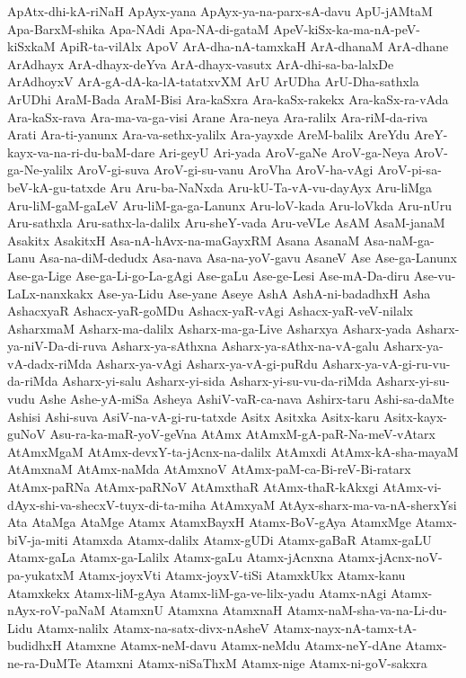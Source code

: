 {ApAtx-dhi-kA-riNaH
ApAyx-yana
ApAyx-ya-na-parx-sA-davu
ApU-jAMtaM
Apa-BarxM-shika
Apa-NAdi
Apa-NA-di-gataM
ApeV-kiSx-ka-ma-nA-peV-kiSxkaM
ApiR-ta-vilAlx
ApoV
ArA-dha-nA-tamxkaH
ArA-dhanaM
ArA-dhane
ArAdhayx
ArA-dhayx-deYva
ArA-dhayx-vasutx
ArA-dhi-sa-ba-lalxDe
ArAdhoyxV
ArA-gA-dA-ka-lA-tatatxvXM
ArU
ArUDha
ArU-Dha-sathxla
ArUDhi
AraM-Bada
AraM-Bisi
Ara-kaSxra
Ara-kaSx-rakekx
Ara-kaSx-ra-vAda
Ara-kaSx-rava
Ara-ma-va-ga-visi
Arane
Ara-neya
Ara-ralilx
Ara-riM-da-riva
Arati
Ara-ti-yanunx
Ara-va-sethx-yalilx
Ara-yayxde
AreM-balilx
AreYdu
AreY-kayx-va-na-ri-du-baM-dare
Ari-geyU
Ari-yada
AroV-gaNe
AroV-ga-Neya
AroV-ga-Ne-yalilx
AroV-gi-suva
AroV-gi-su-vanu
AroVha
AroV-ha-vAgi
AroV-pi-sa-beV-kA-gu-tatxde
Aru
Aru-ba-NaNxda
Aru-kU-Ta-vA-vu-dayAyx
Aru-liMga
Aru-liM-gaM-gaLeV
Aru-liM-ga-ga-Lanunx
Aru-loV-kada
Aru-loVkda
Aru-nUru
Aru-sathxla
Aru-sathx-la-dalilx
Aru-sheY-vada
Aru-veVLe
AsAM
AsaM-janaM
Asakitx
AsakitxH
Asa-nA-hAvx-na-maGayxRM
Asana
AsanaM
Asa-naM-ga-Lanu
Asa-na-diM-dedudx
Asa-nava
Asa-na-yoV-gavu
AsaneV
Ase
Ase-ga-Lanunx
Ase-ga-Lige
Ase-ga-Li-go-La-gAgi
Ase-gaLu
Ase-ge-Lesi
Ase-mA-Da-diru
Ase-vu-LaLx-nanxkakx
Ase-ya-Lidu
Ase-yane
Aseye
AshA
AshA-ni-badadhxH
Asha
AshacxyaR
Ashacx-yaR-goMDu
Ashacx-yaR-vAgi
Ashacx-yaR-veV-nilalx
AsharxmaM
Asharx-ma-dalilx
Asharx-ma-ga-Live
Asharxya
Asharx-yada
Asharx-ya-niV-Da-di-ruva
Asharx-ya-sAthxna
Asharx-ya-sAthx-na-vA-galu
Asharx-ya-vA-dadx-riMda
Asharx-ya-vAgi
Asharx-ya-vA-gi-puRdu
Asharx-ya-vA-gi-ru-vu-da-riMda
Asharx-yi-salu
Asharx-yi-sida
Asharx-yi-su-vu-da-riMda
Asharx-yi-su-vudu
Ashe
Ashe-yA-miSa
Asheya
AshiV-vaR-ca-nava
Ashirx-taru
Ashi-sa-daMte
Ashisi
Ashi-suva
AsiV-na-vA-gi-ru-tatxde
Asitx
Asitxka
Asitx-karu
Asitx-kayx-guNoV
Asu-ra-ka-maR-yoV-geVna
AtAmx
AtAmxM-gA-paR-Na-meV-vAtarx
AtAmxMgaM
AtAmx-devxY-ta-jAcnx-na-dalilx
AtAmxdi
AtAmx-kA-sha-mayaM
AtAmxnaM
AtAmx-naMda
AtAmxnoV
AtAmx-paM-ca-Bi-reV-Bi-ratarx
AtAmx-paRNa
AtAmx-paRNoV
AtAmxthaR
AtAmx-thaR-kAkxgi
AtAmx-vi-dAyx-shi-va-shecxV-tuyx-di-ta-miha
AtAmxyaM
AtAyx-sharx-ma-va-nA-sherxYsi
Ata
AtaMga
AtaMge
Atamx
AtamxBayxH
Atamx-BoV-gAya
AtamxMge
Atamx-biV-ja-miti
Atamxda
Atamx-dalilx
Atamx-gUDi
Atamx-gaBaR
Atamx-gaLU
Atamx-gaLa
Atamx-ga-Lalilx
Atamx-gaLu
Atamx-jAcnxna
Atamx-jAcnx-noV-pa-yukatxM
Atamx-joyxVti
Atamx-joyxV-tiSi
AtamxkUkx
Atamx-kanu
Atamxkekx
Atamx-liM-gAya
Atamx-liM-ga-ve-lilx-yadu
Atamx-nAgi
Atamx-nAyx-roV-paNaM
AtamxnU
Atamxna
AtamxnaH
Atamx-naM-sha-va-na-Li-du-Lidu
Atamx-nalilx
Atamx-na-satx-divx-nAsheV
Atamx-nayx-nA-tamx-tA-budidhxH
Atamxne
Atamx-neM-davu
Atamx-neMdu
Atamx-neY-dAne
Atamx-ne-ra-DuMTe
Atamxni
Atamx-niSaThxM
Atamx-nige
Atamx-ni-goV-sakxra
}
